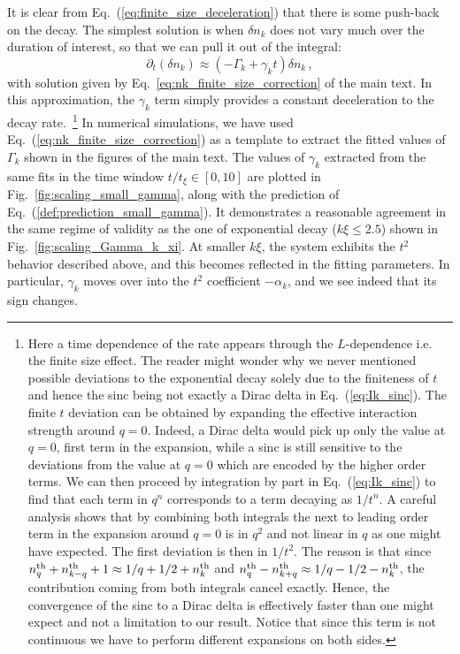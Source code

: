 \documentclass[aps,prd,notitlepage,amsfonts,amssymb,amsmath,nofootinbib,superscriptaddress,longbibliography]{revtex4-2}
\begin{document}
\begin{appendices}
It is clear from Eq.~(\ref{eq:finite_size_deceleration}) that there is some push-back on the decay.  The simplest solution is when $\delta n_{k}$ does not vary much over the duration of interest, so that we can pull it out of the integral:
\begin{equation}
    \partial_{t}\left(\delta n_{k}\right) \approx \left( -\Gamma_{k} + \gamma_{k} t\right) \delta n_{k} \,,
\end{equation}
with solution given by Eq.~\eqref{eq:nk_finite_size_correction} of the main text.
In this approximation, the $\gamma_{k}$ term simply provides a constant deceleration to the decay rate.~\footnote{Here a time dependence of the rate appears through the $L$-dependence i.e. the finite size effect. The reader might wonder why we never mentioned possible deviations to the exponential decay solely due to the finiteness of $t$ and hence the sinc being not exactly a Dirac delta in Eq.~(\ref{eq:Ik_sinc}). The finite $t$ deviation can be obtained by expanding the effective interaction strength around $q = 0$. Indeed, a Dirac delta would pick up only the value at $q=0$, first term in the expansion, while a sinc is still sensitive to the deviations from the value at $q=0$ which are encoded by the higher order terms. We can then proceed by integration by part in Eq.~(\ref{eq:Ik_sinc}) to find that each term in $q^n$ corresponds to a term decaying as $1/t^{n}$. A careful analysis shows that by combining both integrals the next to leading order term in the expansion around $q=0$ is in $q^2$ and not linear in $q$ as one might have expected. The first deviation is then in $1/t^2$. The reason is that since $n^{\rm th}_q + n^{\rm th}_{k-q} + 1 \approx 1/q + 1/2 + n^{\rm th}_{k}$ and $n^{\rm th}_{q} - n^{\rm th}_{k+q} \approx 1/q - 1/2 - n^{\rm th}_{k}$, the contribution coming from both integrals cancel exactly. Hence, the convergence of the sinc to a Dirac delta is effectively faster than one might expect and not a limitation to our result. Notice that since this term is not continuous we have to perform different expansions on both sides.}
In numerical simulations, we have used Eq.~(\ref{eq:nk_finite_size_correction}) as a template to extract the fitted values of $\Gamma_k$ shown in the figures of the main text.  The values of $\gamma_k$ extracted from the same fits in the time window $t / t_{\xi} \in \left[ 0, 10\right]$ are plotted in Fig.~\ref{fig:scaling_small_gamma}, along with the prediction of Eq.~(\ref{def:prediction_small_gamma}). It demonstrates a reasonable agreement in the same regime of validity as the one of exponential decay ($k \xi \leq 2.5$) shown in Fig.~\ref{fig:scaling_Gamma_k_xi}. At smaller $k\xi$, the system exhibits the $t^{2}$ behavior described above, and this becomes reflected in the fitting parameters.  In particular, $\gamma_{k}$ moves over into the $t^{2}$ coefficient $-\alpha_{k}$, and we see indeed that its sign changes.


\end{appendices}
\end{document}

